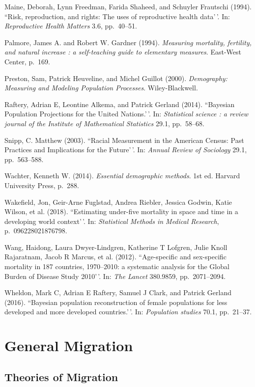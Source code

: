 \documentclass[11pt,]{article}
\begin{document}
Maine, Deborah, Lynn Freedman, Farida Shaheed, and Schuyler Frautschi
(1994). ``Risk, reproduction, and rights: The uses of reproductive
health data'\,'. In: \emph{Reproductive Health Matters} 3.6, pp.~40--51.

Palmore, James A. and Robert W. Gardner (1994).
\emph{Measuring mortality, fertility, and natural increase : a self-teaching guide to elementary measures}.
East-West Center, p.~169.

Preston, Sam, Patrick Heuveline, and Michel Guillot (2000).
\emph{Demography: Measuring and Modeling Population Processes}.
Wiley-Blackwell.

Raftery, Adrian E, Leontine Alkema, and Patrick Gerland (2014).
``Bayesian Population Projections for the United Nations.'\,'. In:
\emph{Statistical science : a review journal of the Institute of Mathematical Statistics}
29.1, pp.~58--68.

Snipp, C. Matthew (2003). ``Racial Measurement in the American Census:
Past Practices and Implications for the Future'\,'. In:
\emph{Annual Review of Sociology} 29.1, pp.~563--588.

Wachter, Kenneth W. (2014). \emph{Essential demographic methods}. 1st
ed. Harvard University Press, p.~288.

Wakefield, Jon, Geir-Arne Fuglstad, Andrea Riebler, Jessica Godwin,
Katie Wilson, et al. (2018). ``Estimating under-five mortality in space
and time in a developing world context'\,'. In:
\emph{Statistical Methods in Medical Research}, p.~096228021876798.

Wang, Haidong, Laura Dwyer-Lindgren, Katherine T Lofgren, Julie Knoll
Rajaratnam, Jacob R Marcus, et al. (2012). ``Age-specific and
sex-specific mortality in 187 countries, 1970--2010: a systematic
analysis for the Global Burden of Disease Study 2010'\,'. In:
\emph{The Lancet} 380.9859, pp.~2071--2094.

Wheldon, Mark C, Adrian E Raftery, Samuel J Clark, and Patrick Gerland
(2016). ``Bayesian population reconstruction of female populations for
less developed and more developed countries.'\,'. In:
\emph{Population studies} 70.1, pp.~21--37.

\hypertarget{general-migration}{%
\section{General Migration}\label{general-migration}}

\hypertarget{theories-of-migration}{%
\subsection{Theories of Migration}\label{theories-of-migration}}
\end{document}
